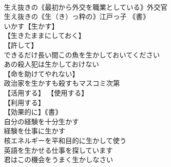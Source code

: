 \documentclass[8pt]{extreport}
\begin{document}
\begin{CJK}{UTF8}{min}
\\	生え抜きの｟最初から外交を職業としている｠外交官 
\\	生え抜きの｟生（き）っ粋の｠江戸っ子 ｟書｠
\\	いかす【生かす】 
\\	【生きたままにしておく】 
\\	【許して】
\\	できるだけ長い間この魚を生かしておいてください 
\\	あの殺人犯は生かしておけない 
\\	【命を助けてやれない】
\\	政治家を生かすも殺すもマスコミ次第 
\\	【活用する】 【使用する】
\\	【利用する】
\\	【効果的に】｟書｠
\\	自分の経験を十分生かす 
\\	経験を仕事に生かす 
\\	核エネルギーを平和目的に生かして使う 
\\	英語を生かせる仕事を探しています 
\\	君はこの機会をうまく生かしなさい 
\\	[｟書｠ 
\\	いきた【生きた】 〖生きている〗
\\	(!限定的に) 
\\	(!叙述的に) 
\\	(!限定的にも叙述的にも用い, 前の2語より意味範囲が広い) 
\\	生きたネズミで実験する 
\\	生きた英語を学ぶ 
\\	[(実際使われている) 
\\	(日常の) 
\\	彼は生きたまま埋められた 
\\	生きた心地がしなかった 
\\	はこの動作表現) 【命が縮むほどおびえた】
\\	いきぬく【生き抜く】 【生き延びる】
\\	【切り抜ける】
\\	【生き残る】
\\	二つの戦争を生き抜く 
\\	いきもの【生き物】 
\\	｟集合的｠
\\	【植物を除く】
\\	（⇨生物） 
\\	密林の生き物を殺す 
\\	政治は生き物，一寸先は闇だ[分からない] 

\end{CJK}
\end{document}
